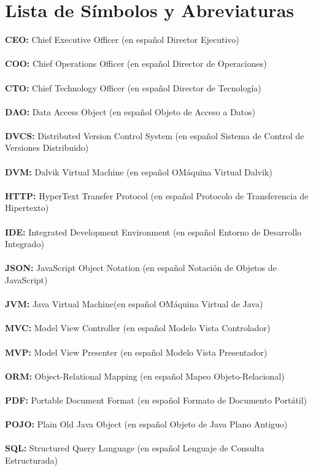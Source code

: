 \chapter*{Lista de Símbolos y Abreviaturas}%
\textbf{CEO:} Chief Executive Officer (en español Director Ejecutivo)\\ \\
\textbf{COO:} Chief Operations Officer (en español Director de Operaciones)\\ \\
\textbf{CTO:} Chief Technology Officer (en español Director de Tecnología)\\ \\
\textbf{DAO:} Data Access Object (en español Objeto de Acceso a Datos)\\ \\
\textbf{DVCS:} Distributed Version Control System (en español Sistema de Control de Versiones Distribuido)\\ \\
\textbf{DVM:} Dalvik Virtual Machine (en español OMáquina Virtual Dalvik)\\ \\
\textbf{HTTP:} HyperText Transfer Protocol (en español Protocolo de Transferencia de Hipertexto)\\ \\
\textbf{IDE:} Integrated Development Environment (en español Entorno de Desarrollo Integrado)\\ \\
\textbf{JSON:} JavaScript Object Notation (en español Notación de Objetos de JavaScript)\\ \\
\textbf{JVM:} Java Virtual Machine(en español OMáquina Virtual de Java)\\ \\
\textbf{MVC:} Model View Controller (en español Modelo Vista Controlador)\\ \\
\textbf{MVP:} Model View Presenter (en español Modelo Vista Presentador)\\ \\
\textbf{ORM:} Object-Relational Mapping (en español Mapeo Objeto-Relacional)\\ \\
\textbf{PDF:} Portable Document Format (en español Formato de Documento Portátil)\\ \\
\textbf{POJO:} Plain Old Java Object (en español Objeto de Java Plano Antiguo)\\ \\
\textbf{SQL:} Structured Query Language (en español Lenguaje de Consulta Estructurada)\\ \\
